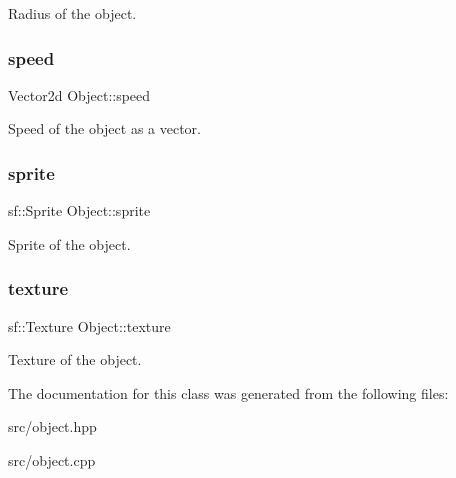 Radius of the object. \hypertarget{classObject_a740762c9fe723eda94fe82862a8fa200}{}\label{classObject_a740762c9fe723eda94fe82862a8fa200} 
\subsubsection{\texorpdfstring{speed}{speed}}
{\footnotesize\ttfamily Vector2d Object\+::speed\hspace{0.3cm}{\ttfamily [protected]}}

Speed of the object as a vector. \hypertarget{classObject_a65be09abc56e93e0154c3a0e37f97579}{}\label{classObject_a65be09abc56e93e0154c3a0e37f97579} 
\subsubsection{\texorpdfstring{sprite}{sprite}}
{\footnotesize\ttfamily sf\+::\+Sprite Object\+::sprite\hspace{0.3cm}{\ttfamily [protected]}}

Sprite of the object. \hypertarget{classObject_a8abc6192982ee39b2dc9d9b05cc155ee}{}\label{classObject_a8abc6192982ee39b2dc9d9b05cc155ee} 
\subsubsection{\texorpdfstring{texture}{texture}}
{\footnotesize\ttfamily sf\+::\+Texture Object\+::texture\hspace{0.3cm}{\ttfamily [protected]}}

Texture of the object. 

The documentation for this class was generated from the following files\+:\begin{DoxyCompactItemize}
\item 
src/object.\+hpp\item 
src/object.\+cpp\end{DoxyCompactItemize}
